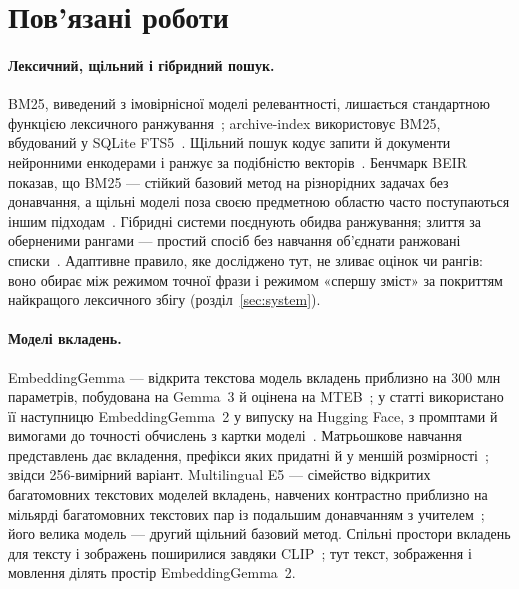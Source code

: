 \section{Пов'язані роботи}\label{sec:related}

\paragraph{Лексичний, щільний і гібридний пошук.}
BM25, виведений з імовірнісної моделі релевантності, лишається стандартною функцією лексичного ранжування~\citep{robertson2009bm25}; archive-index використовує BM25, вбудований у SQLite FTS5~\citep{sqlitefts5}. Щільний пошук кодує запити й документи нейронними енкодерами і ранжує за подібністю векторів~\citep{reimers2019sbert,karpukhin2020dpr}. Бенчмарк BEIR показав, що BM25 --- стійкий базовий метод на різнорідних задачах без донавчання, а щільні моделі поза своєю предметною областю часто поступаються іншим підходам~\citep{thakur2021beir}. Гібридні системи поєднують обидва ранжування; злиття за оберненими рангами --- простий спосіб без навчання об'єднати ранжовані списки~\citep{cormack2009rrf}. Адаптивне правило, яке досліджено тут, не зливає оцінок чи рангів: воно обирає між режимом точної фрази і режимом «спершу зміст» за покриттям найкращого лексичного збігу (розділ~\ref{sec:system}).

\paragraph{Моделі вкладень.}
EmbeddingGemma --- відкрита текстова модель вкладень приблизно на 300 млн параметрів, побудована на Gemma~3 й оцінена на MTEB~\citep{vera2025embeddinggemma}; у статті використано її наступницю EmbeddingGemma~2 у випуску на Hugging Face, з промптами й вимогами до точності обчислень з картки моделі~\citep{google2026embeddinggemma2card}. Матрьошкове навчання представлень дає вкладення, префікси яких придатні й у меншій розмірності~\citep{kusupati2022matryoshka}; звідси 256-вимірний варіант. Multilingual E5 --- сімейство відкритих багатомовних текстових моделей вкладень, навчених контрастно приблизно на мільярді багатомовних текстових пар із подальшим донавчанням з учителем~\citep{wang2024me5}; його велика модель --- другий щільний базовий метод. Спільні простори вкладень для тексту і зображень поширилися завдяки CLIP~\citep{radford2021clip}; тут текст, зображення і мовлення ділять простір EmbeddingGemma~2.

